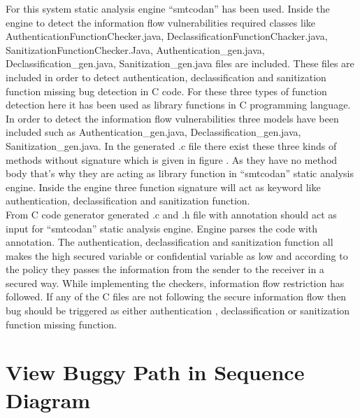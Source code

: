 For this system static analysis engine \enquote{smtcodan}  has been used. Inside the engine to detect the information flow vulnerabilities required classes like AuthenticationFunctionChecker.java, DeclassificationFunctionChacker.java, SanitizationFunctionChecker.Java, Authentication\_gen.java,\\
Declassification\_gen.java,
Sanitization\_gen.java files are included. These files are included in order to detect authentication, declassification and sanitization function missing bug detection in C code. For these three types of function detection here it has been used as library functions in C programming language. In order to detect the information flow vulnerabilities three models have been included such as Authentication\_gen.java,
Declassification\_gen.java,
Sanitization\_gen.java. In the generated .c file there exist these three kinds of methods without signature which is given in figure . As they have no method body that's why they are acting as library function in \enquote{smtcodan} static analysis engine. Inside the engine three function signature will act as keyword like authentication, declassification and sanitization function. \\

From C code generator generated .c and .h file with annotation should act as input for \enquote{smtcodan} static analysis engine. Engine parses the code with annotation. The authentication, declassification and sanitization function all makes the high secured variable or confidential variable as low and according to the policy they passes the information from the sender to the receiver in a secured way. While implementing the checkers, information flow restriction has followed. If any of the C files are not following the secure information flow then bug should be triggered as either authentication , declassification or sanitization function missing function.

\section{View Buggy Path in Sequence Diagram}

